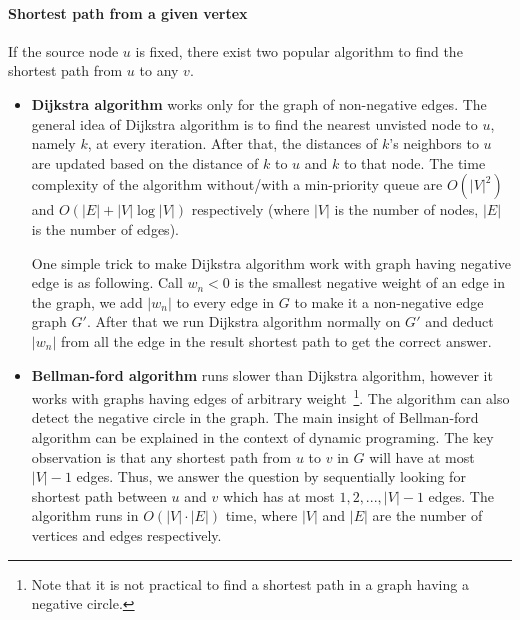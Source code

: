 \paragraph{Shortest path from a given vertex} If the source node $u$ is fixed, there exist two popular algorithm to find the shortest path from $u$ to any $v$.
	\begin{itemize}
		\item {\bf Dijkstra algorithm} works only for the graph of non-negative edges. The general idea of Dijkstra algorithm is to find the nearest unvisted node to $u$, namely $k$, at every iteration. After that, the distances of $k$'s neighbors to $u$ are updated based on the distance of $k$ to $u$ and $k$ to that node. The time complexity of the algorithm without/with a min-priority queue are $O(|V|^2)$ and  $O(|E|+|V|\log|V|)$ respectively (where $|V|$ is the number of nodes, $|E|$ is the number of edges).

		One simple trick to make Dijkstra algorithm work with graph having negative edge is as following. Call $w_n < 0$ is the smallest negative weight of an edge in the graph, we add $|w_n|$ to every edge in $G$ to make it a non-negative edge graph $G'$. After that we run Dijkstra algorithm normally on $G'$ and deduct $|w_n|$ from all the edge in the result shortest path to get the correct answer.

		\item {\bf Bellman-ford algorithm} runs slower than Dijkstra algorithm, however it works with graphs having edges of arbitrary weight~\footnote{Note that it is not practical to find a shortest path in a graph having a negative circle.}. The algorithm can also detect the negative circle in the graph. The main insight of Bellman-ford algorithm can be explained in the context of dynamic programing. 		
		The key observation is that any shortest path from $u$ to $v$ in $G$ will have at most $|V|−1$ edges. Thus, we answer the question by sequentially looking for shortest path between $u$ and $v$ which has at most $1, 2, ..., |V|-1$ edges. The algorithm runs in  $O(|V|\cdot |E|)$ time, where $|V|$ and $|E|$ are the number of vertices and edges respectively.
	\end{itemize}

